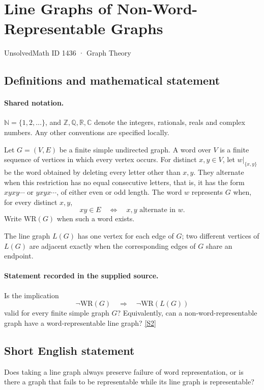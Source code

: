 \documentclass[11pt]{article}
\newcommand{\sref}[2]{\hyperlink{source:#1:#2}{[S#2]}}
\begin{document}
\setcounter{section}{1435}
\section{Line Graphs of Non-Word-Representable Graphs}\label{1436}
{\small\sffamily UnsolvedMath ID 1436 · Graph Theory}
\subsection{Definitions and mathematical statement}

\paragraph{Shared notation.}$\mathbb N=\{1,2,\ldots\}$, and $\mathbb Z,\mathbb Q,\mathbb R,\mathbb C$ denote the integers, rationals, reals and complex numbers. Any other conventions are specified locally.


Let $G=(V,E)$ be a finite simple undirected graph. A word over $V$ is a finite sequence of vertices in which every vertex occurs. For distinct $x,y\in V$, let $w|_{\{x,y\}}$ be the word obtained by deleting every letter other than $x,y$. They alternate when this restriction has no equal consecutive letters, that is, it has the form $xyxy\cdots$ or $yxyx\cdots$, of either even or odd length. The word $w$ represents $G$ when, for every distinct $x,y$,
\[
 xy\in E\quad\Longleftrightarrow\quad x,y\text{ alternate in }w.
\]
Write $\mathrm{WR}(G)$ when such a word exists.

The line graph $L(G)$ has one vertex for each edge of $G$; two different vertices of $L(G)$ are adjacent exactly when the corresponding edges of $G$ share an endpoint.
\paragraph{Statement recorded in the supplied source.}
Is the implication
\[
 \neg\mathrm{WR}(G)\quad\Longrightarrow\quad\neg\mathrm{WR}(L(G))
\]
valid for every finite simple graph $G$? Equivalently, can a non-word-representable graph have a word-representable line graph? \sref{1436}{2}
\subsection{Short English statement}
Does taking a line graph always preserve failure of word representation, or is there a graph that fails to be representable while its line graph is representable?
\end{document}
